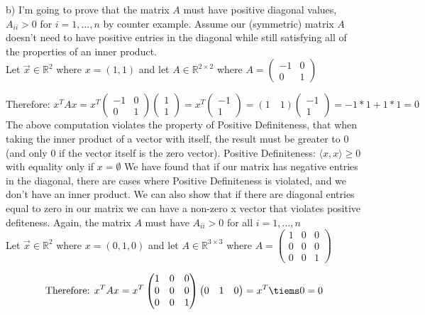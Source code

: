 \documentclass[12pt,twoside]{article}
\begin{document}
b) I'm going to prove that the matrix $A$ must have positive diagonal values, $A_{ii} > 0$ for $i = 1, \dots, n$ by counter example. Assume our (symmetric) matrix $A$ doesn't need to have positive entries in the diagonal while still satisfying all of the properties of an inner product. \\

Let $\vec{x} \in \mathbb{R}^2$ where $x = (1,1)$ and let $A \in \mathbb{R}^{2\times 2}$ where $A = \begin{pmatrix} 
-1 & 0 \\
0 & 1 
\end{pmatrix}$

$$ \text{Therefore: } x^TAx = x^T \begin{pmatrix} 
-1 & 0 \\
0 & 1 
\end{pmatrix} \begin{pmatrix} 
1 \\
1 
\end{pmatrix}  = x^T \begin{pmatrix} 
-1 \\
1 
\end{pmatrix} = (1 \quad 1) \begin{pmatrix} 
-1 \\
1 
\end{pmatrix} = -1*1 + 1*1 = 0$$
The above computation violates the property of Positive Definiteness, that when taking the inner product of a vector with itself, the result must be greater to 0 (and only 0 if the vector itself is the zero vector). Positive Definiteness: $\langle x,x \rangle \geq 0$ with equality only if $x=\emptyset$ We have found that if our matrix has negative entries in the diagonal, there are cases where Positive Definiteness is violated, and we don't have an inner product. 
We can also show that if there are diagonal entries equal to zero in our matrix we can have a non-zero x vector that violates positive defiteness. Again, the matrix $A$ must have $A_{ii} > 0$ for all $i=1,\dots,n$\\

Let $\vec{x} \in \mathbb{R}^2$ where $x = (0,1,0)$ and let $A \in \mathbb{R}^{3\times 3}$ where $A = \begin{pmatrix} 
1 & 0 & 0\\
0 & 0 & 0 \\
0 & 0 & 1
\end{pmatrix}$

$$
\text{Therefore: } x^TAx = x^T \begin{pmatrix} 
1 & 0 & 0\\
0 & 0 & 0 \\
0 & 0 & 1
\end{pmatrix} \begin{pmatrix} 0 & 1 & 0 \end{pmatrix} = x^T \tiems 0 = 0$$
\end{document}
